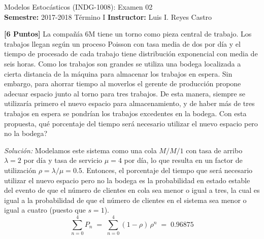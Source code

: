 \documentclass[ a4paper, twoside, 11pt]{article}
\newcommand{\numero}{02}
\begin{document}
\allowdisplaybreaks

\begin{center}
\Large Modelos Estoc\'asticos (INDG-1008): Examen \numero \\[1ex]
\small \textbf{Semestre:} 2017-2018 T\'ermino I \qquad
\textbf{Instructor:} Luis I. Reyes Castro
\end{center}
\halfskip



\halfskip

\begin{problem}
\textbf{[6 Puntos]} La compa\~n\'ia 6M tiene un torno como pieza central de trabajo. Los trabajos llegan seg\'un un proceso Poisson con tasa media de dos por d\'ia y el tiempo de procesado de cada trabajo tiene distribuci\'on exponencial con media de seis horas. Como los trabajos son grandes se utiliza una bodega localizada a cierta distancia de la m\'aquina para almacenar los trabajos en espera. Sin embargo, para ahorrar tiempo al moverlos el gerente de producci\'on propone adecuar espacio junto al torno para tres trabajos. De esta manera, siempre se utilizar\'ia primero el nuevo espacio para almacenamiento, y de haber m\'as de tres trabajos en espera se pondr\'ian los trabajos excedentes en la bodega. Con esta propuesta, qu\'e porcentaje del tiempo ser\'a necesario utilizar el nuevo espacio pero no la bodega? 

\emph{Soluci\'on:} Modelamos este sistema como una cola $M/M/1$ con tasa de arribo $\lambda = 2$ por d\'ia y tasa de servicio $\mu = 4$ por d\'ia, lo que resulta en un factor de utilizaci\'on $\rho = \lambda / \mu = 0.5$. Entonces, el porcentaje del tiempo que ser\'a necesario utilizar el nuevo espacio pero no la bodega es la probabilidad en estado estable del evento de que el n\'umero de clientes en cola sea menor o igual a tres, la cual es igual a la probabilidad de que el n\'umero de clientes en el sistema sea menor o igual a cuatro (puesto que $s=1$). \Iec 
\[
\sum_{n=0}^4 P_n \; = \;
\sum_{n=0}^4 ( 1 - \rho ) \, \rho^n \; = \;
0.96875
\]

\end{problem}
\vspace{\baselineskip}
\end{document}
